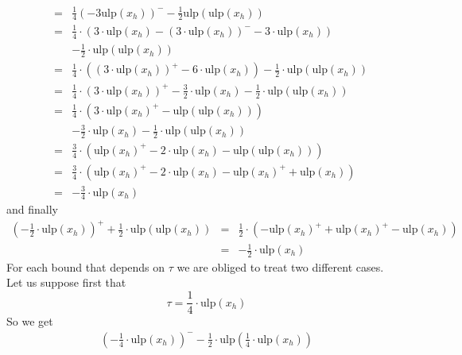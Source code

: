 \documentclass[a4paper,10pt,twoside]{article}
\newenvironment{proof}[1][Proof]{\begin{trivlist}
\item[\hskip \labelsep {\bfseries #1}]}{\end{trivlist}}
\newcommand{\hi}{\ensuremath{\mathit{h}}}
\newcommand{\mUlp}{\ensuremath{\mathrm{ulp}}}
\begin{document}
\begin{proof}
\begin{eqnarray*}
& = & \frac{1}{4} \left( - 3 \mUlp\left( x_\hi \right) \right)^- -
\frac{1}{2} \mUlp\left( \mUlp\left( x_\hi \right) \right) \\
& = & \frac{1}{4} \cdot \left( 3 \cdot \mUlp\left( x_\hi \right) - \left( 3 \cdot \mUlp\left( x_\hi \right) \right)^-
- 3 \cdot \mUlp\left( x_\hi \right) \right) \\
& & - \frac{1}{2} \cdot \mUlp \left( \mUlp \left( x_\hi \right) \right) \\
& = & \frac{1}{4} \cdot \left( \left( 3 \cdot \mUlp\left( x_\hi \right) \right)^+ -
6 \cdot \mUlp\left( x_\hi \right) \right) - \frac{1}{2} \cdot \mUlp \left( \mUlp \left( x_\hi \right) \right) \\
& = & \frac{1}{4} \cdot \left( 3 \cdot \mUlp\left( x_\hi \right) \right)^+ - \frac{3}{2} \cdot \mUlp\left( x_\hi \right)
- \frac{1}{2} \cdot \mUlp \left( \mUlp \left( x_\hi \right) \right) \\
& = & \frac{1}{4} \cdot \left( 3 \cdot \mUlp\left( x_\hi \right)^+ - \mUlp\left(\mUlp\left(x_\hi\right)\right) \right)\\
& & - \frac{3}{2} \cdot \mUlp\left( x_\hi \right) - \frac{1}{2} \cdot \mUlp \left( \mUlp\left( x_\hi \right) \right) \\
& = & \frac{3}{4} \cdot \left( \mUlp\left( x_\hi \right)^+ - 2 \cdot \mUlp\left( x_\hi \right) -
\mUlp\left( \mUlp \left( x_\hi \right) \right) \right) \\
& = & \frac{3}{4} \cdot \left( \mUlp\left( x_\hi \right)^+ - 2 \cdot \mUlp\left( x_\hi \right) -
\mUlp\left( x_\hi\right)^+ + \mUlp\left( x_\hi \right) \right) \\
& = & - \frac{3}{4} \cdot \mUlp\left( x_\hi \right)
\end{eqnarray*}
and finally
\begin{eqnarray*}
\left( - \frac{1}{2} \cdot  \mUlp\left( x_\hi \right)  \right)^+ + \frac{1}{2} \cdot \mUlp\left(  \mUlp\left( x_\hi \right)  \right)
& = & \frac{1}{2} \cdot \left( - \mUlp\left( x_\hi \right)^+ +  \mUlp\left( x_\hi \right)^+ -  \mUlp\left( x_\hi \right)  \right) \\
& = & - \frac{1}{2} \cdot  \mUlp\left( x_\hi \right)
\end{eqnarray*}
For each bound that depends on $\tau$ we are obliged to treat two different cases.\\
Let us suppose first that
$$\tau = \frac{1}{4} \cdot \mUlp \left( x_\hi \right) $$
So we get
\begin{eqnarray*}
\left( - \frac{1}{4} \cdot  \mUlp\left( x_\hi \right)  \right)^- - \frac{1}{2} \cdot \mUlp\left( \frac{1}{4} \cdot  \mUlp\left( x_\hi \right)  \right)

\end{eqnarray*}
\end{proof}
\end{document}
